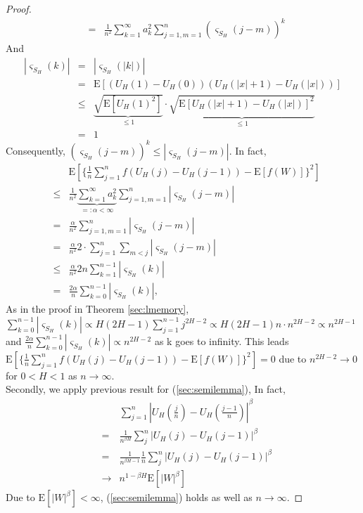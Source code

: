\documentclass[a4paper, twoside, 11pt]{article}
\theoremstyle{definition}
\begin{document}
\begin{proof}
\begin{eqnarray*}
	&=& \frac{1}{n^2} \sum\limits_{k=1}^\infty a_k^2\sum\limits_{j=1, m=1}^n (\varsigma_{S_H}(j-m))^k
  \end{eqnarray*}
	And
	\begin{eqnarray*}
	  |\varsigma_{S_H}(k)| &=& |\varsigma_{S_H}(|k|)|\\
	  &=& \mathrm{E}[(U_H(1) - U_H(0))(U_H(|x|+1)-U_H(|x|))]\\
	  &\le& \underbrace{\sqrt{\mathrm{E}[U_H(1)^2]}}_{\le 1}\cdot \underbrace{\sqrt{\mathrm{E}[U_H(|x|+1) - U_H(|x|)]^2}}_{\le 1}\\
	  &=& 1
	\end{eqnarray*}
	Consequently, $(\varsigma_{S_H}(j-m))^k \le |\varsigma_{S_H}(j-m)|$. In fact,
	\begin{eqnarray*}
	  && \mathrm{E}[\{\frac{1}{n}\sum\limits_{j=1}^n f(U_H(j) - U_H(j-1)) - \mathrm{E}[f(W)]\}^2]\\
	  &\le& \frac{1}{n^2} \underbrace{\sum\limits_{k=1}^\infty a_k^2}_{=:\alpha < \infty}\sum\limits_{j=1, m=1}^n |\varsigma_{S_H}(j-m)|\\
	  &=& \frac{\alpha}{n^2} \sum\limits_{j=1, m=1}^n |\varsigma_{S_H}(j-m)|\\
	  &=& \frac{\alpha}{n^2} 2 \cdot \sum\limits_{j=1}^n  \sum\limits_{m<j} |\varsigma_{S_H}(j-m)|\\
	  &\le& \frac{\alpha}{n^2} 2n \sum\limits_{k=1}^{n-1} |\varsigma_{S_H}(k)|\\
	  &=& \frac{2\alpha}{n}  \sum\limits_{k=0}^{n-1} |\varsigma_{S_H}(k)|,
	\end{eqnarray*}
	As in the proof in Theorem \ref{sec:lmemory}, $\sum\limits_{k=0}^{n-1} |\varsigma_{S_H}(k)| \propto H(2H-1)\sum\limits_{j=1}^{n-1}j^{2H-2} \propto H(2H-1)n\cdot n^{2H-2} \propto n^{2H-1}$ and $\frac{2\alpha}{n} \sum\limits_{k=0}^{n-1} |\varsigma_{S_H}(k)| \propto n^{2H-2}$ as k goes to infinity. This leads  $\mathrm{E}[\{\frac{1}{n}\sum\limits_{j=1}^n f(U_H(j) - U_H(j-1)) - \mathrm{E}[f(W)]\}^2]=0$ due to $n^{2H-2}\rightarrow 0$ for $0<H<1$ as $n \rightarrow \infty$.\\
	Secondly, we apply previous result for (\ref{sec:semilemma}), In fact,
	\begin{eqnarray*}
		&&\sum_{j=1}^n |U_H(\frac{j}{n}) - U_H(\frac{j-1}{n})|^\beta\\
		&=& \frac{1}{n^{\beta H}} \sum_{j}^n|U_H(j) - U_H(j-1)|^\beta\\
		&=& \frac{1}{n^{\beta H-1}} \frac{1}{n}\sum_{j}^n|U_H(j) - U_H(j-1)|^\beta\\
		&\longrightarrow& n^{1-\beta H}\mathrm{E}[|W|^\beta]
	  \end{eqnarray*}
	  Due to $\mathrm{E}[|W|^\beta] < \infty$, (\ref{sec:semilemma}) holds as well as $n\rightarrow \infty$.
\end{proof}
\end{document}
